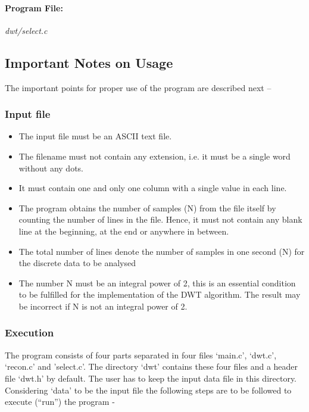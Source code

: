 \documentclass[a4paper,11pt]{report}
\begin{document}
\paragraph{Program File:} \textit{dwt/select.c}
\vspace{5pt}
{\scriptsize
\begin{lgrind}

\end{lgrind}
}

\subsection{Important Notes on Usage} 

The important points for proper use of the program are described next --

\subsubsection{Input file} \label{fftreq}
\begin{itemize}
\item The input file must be an ASCII text file.
\item The filename must not contain any extension, i.e. it must be a single word without any dots.
\item It must contain one and only one column with a single value in each line.
\item The program obtains the number of samples (N) from the file itself by counting the number of lines in the file. Hence, it must not contain any blank line at the beginning, at the end or anywhere in between.
\item The total number of lines denote the number of samples in one second (N) for the discrete data to be analysed
\item The number N must be an integral power of 2, this is an essential condition to be fulfilled for the implementation of the DWT algorithm. The result may be incorrect if N is not an integral power of 2.  
\end{itemize}

\subsubsection{Execution}

The program consists of four parts separated in four files `main.c', `dwt.c', `recon.c' and 'select.c'. The directory `dwt' contains these four files and a header file `dwt.h' by default. The user has to keep the input data file in this directory. Considering `data' to be the input file the following steps are to be followed to execute (``run'') the program - 
	
\end{document}
